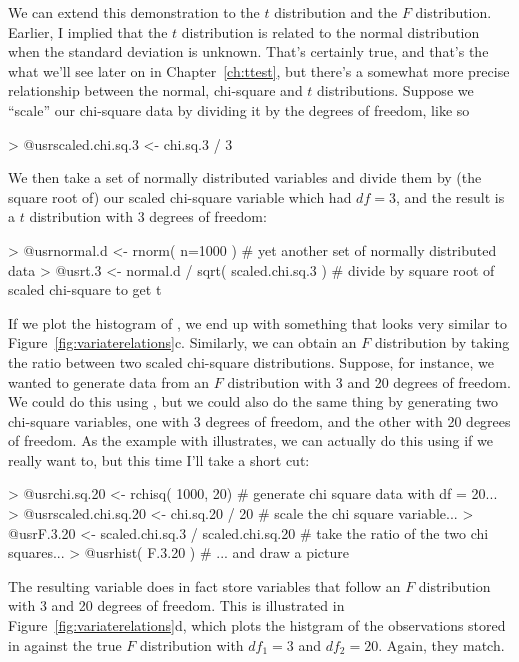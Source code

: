 We can extend this demonstration to the $t$ distribution and the $F$ distribution. Earlier, I implied that the $t$ distribution is related to the normal distribution when the standard deviation is unknown. That's certainly true, and that's the what we'll see later on in  Chapter~\ref{ch:ttest}, but there's a somewhat more precise relationship between the normal, chi-square and $t$ distributions. Suppose we ``scale'' our chi-square data by dividing it by the degrees of freedom, like so
\begin{rblock1}
> @usr{scaled.chi.sq.3 <- chi.sq.3 / 3}
\end{rblock1}
We then take a set of normally distributed variables and divide them by (the square root of) our scaled chi-square variable which had $df=3$, and the result is a $t$ distribution with 3 degrees of freedom:
\begin{rblock1}
> @usr{normal.d <- rnorm( n=1000 )}  # yet another set of normally distributed data
> @usr{t.3 <- normal.d / sqrt( scaled.chi.sq.3 )}  # divide by square root of scaled chi-square to get t
\end{rblock1}
If we plot the histogram of , we end up with something that looks very similar to Figure~\ref{fig:variaterelations}c. Similarly, we can obtain an $F$ distribution by taking the ratio between two scaled chi-square distributions. Suppose, for instance, we wanted to generate data from an $F$ distribution with 3 and 20 degrees of freedom. We could do this using , but we could also do the same thing by generating two chi-square variables, one with 3 degrees of freedom, and the other with 20 degrees of freedom. As the example with  illustrates, we can actually do this using  if we really want to, but this time I'll take a short cut:
\begin{rblock1}
> @usr{chi.sq.20 <- rchisq( 1000, 20)}  # generate chi square data with df = 20...
> @usr{scaled.chi.sq.20 <- chi.sq.20 / 20}  # scale the chi square variable...
> @usr{F.3.20 <-  scaled.chi.sq.3  / scaled.chi.sq.20} # take the ratio of the two chi squares...
> @usr{hist( F.3.20 )} # ... and draw a picture
\end{rblock1}
The resulting  variable does in fact store variables that follow an $F$ distribution with 3 and 20 degrees of freedom. This is illustrated in Figure~\ref{fig:variaterelations}d, which plots the histgram of the observations stored in  against the true $F$ distribution with $df_1 = 3$ and $df_2 = 20$. Again, they match. 

